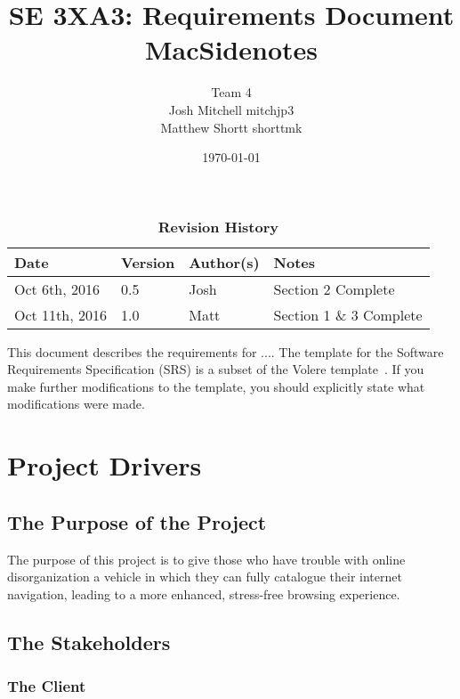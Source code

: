 \documentclass[12pt, titlepage]{article}
\title{SE 3XA3: Requirements Document\\MacSidenotes}
\author{Team 4
		\\ Josh Mitchell mitchjp3
		\\ Matthew Shortt shorttmk
}
\date{\today}
\begin{document}
\maketitle

\tableofcontents
\listoftables
\listoffigures



\begin{table}[h]
\caption{\bf Revision History}
\begin{tabularx}{\textwidth}{p{3cm}p{2cm}p{2cm}X}
\toprule {\bf Date} & {\bf Version} & {\bf Author(s)} & {\bf Notes}\\
\midrule
Oct 6th, 2016 & 0.5 & Josh & Section 2 Complete\\
Oct 11th, 2016 & 1.0 & Matt & Section 1 \& 3 Complete\\
\bottomrule
\end{tabularx}
\end{table}

\newpage



This document describes the requirements for ....  The template for the Software
Requirements Specification (SRS) is a subset of the Volere
template~\citep{RobertsonAndRobertson2012}.  If you make further modifications
to the template, you should explicitly state what modifications were made.

\section{Project Drivers}

\subsection{The Purpose of the Project}

The purpose of this project is to give those who have trouble with online disorganization 
a vehicle in which they can fully catalogue their internet navigation, leading to a more 
enhanced, stress-free browsing experience. 

\subsection{The Stakeholders}

\subsubsection{The Client}
\end{document}
